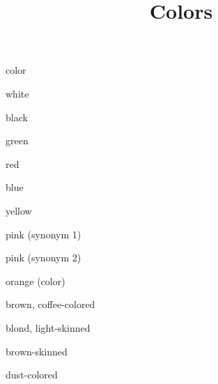 \documentclass[avery5371,grid,frame]{flashcards}
\title{Colors}
\begin{document}
\begin{flashcard}{\LARGE color}
\LARGE {}
\end{flashcard}
\begin{flashcard}{\LARGE white}
\LARGE {}
\end{flashcard}
\begin{flashcard}{\LARGE black}
\LARGE {}
\end{flashcard}
\begin{flashcard}{\LARGE green}
\LARGE {}
\end{flashcard}
\begin{flashcard}{\LARGE red}
\LARGE {}
\end{flashcard}
\begin{flashcard}{\LARGE blue}
\LARGE {}
\end{flashcard}
\begin{flashcard}{\LARGE yellow}
\LARGE {}
\end{flashcard}
\begin{flashcard}{\LARGE pink (synonym 1)}
\LARGE {}
\end{flashcard}
\begin{flashcard}{\LARGE pink (synonym 2)}
\LARGE {}
\end{flashcard}
\begin{flashcard}{\LARGE orange (color)}
\LARGE {}
\end{flashcard}
\begin{flashcard}{\LARGE brown, coffee-colored}
\LARGE {}
\end{flashcard}
\begin{flashcard}{\LARGE blond, light-skinned}
\LARGE {}
\end{flashcard}
\begin{flashcard}{\LARGE brown-skinned}
\LARGE {}
\end{flashcard}
\begin{flashcard}{\LARGE dust-colored}
\LARGE {}
\end{flashcard}
\end{document}
